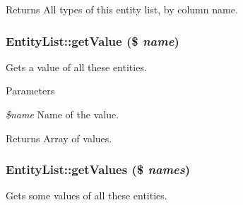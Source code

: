 \begin{DoxyReturn}{Returns}
All types of this entity list, by column name. 
\end{DoxyReturn}
\hypertarget{classEntityList_a740ab9d2b87a8641b47e29b80b99badc}{
\subsubsection[{getValue}]{\setlength{\rightskip}{0pt plus 5cm}EntityList::getValue (\$ {\em name})}}
\label{classEntityList_a740ab9d2b87a8641b47e29b80b99badc}
Gets a value of all these entities.


\begin{DoxyParams}{Parameters}
\item[{\em \$name}]Name of the value.\end{DoxyParams}
\begin{DoxyReturn}{Returns}
Array of values. 
\end{DoxyReturn}
\hypertarget{classEntityList_ada2cd7ee35783d406d1d58c0814afd3e}{
\subsubsection[{getValues}]{\setlength{\rightskip}{0pt plus 5cm}EntityList::getValues (\$ {\em names})}}
\label{classEntityList_ada2cd7ee35783d406d1d58c0814afd3e}
Gets some values of all these entities.


